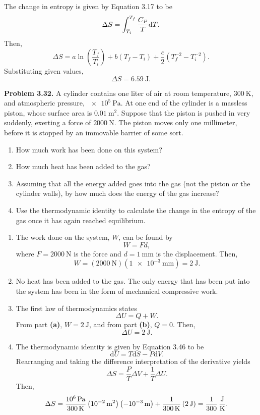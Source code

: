 \documentclass[a4paper, 12pt]{config/homework}
\begin{document}
\noindent
The change in entropy is given by Equation 3.17 to be
\[\Delta S = \int_{T_i}^{T_f}{\frac{C_P}{T} \text{d}T}.\]
Then,
\[\Delta S = a\ln\left(\frac{T_f}{T_i}\right) + b\left(T_f - T_i\right) + \frac{c}{2}\left(T^{-2}_f - T^{-2}_i\right).\]
Substituting given values,
\[\Delta S = \qty{6.59}{\joule}.\]


\pagebreak
\noindent
\textbf{Problem 3.32.} A cylinder contains one liter of air at room temperature, \(\qty{300}{\kelvin}\), and atmospheric pressure, \(\qty{e5}{\Pa}\). At one end of the cylinder is a massless piston, whose surface area is \(\qty{0.01}{\meter\squared}\). Suppose that the piston is pushed in very suddenly, exerting a force of \(\qty{2000}{\newton}\). The piston moves only one millimeter, before it is stopped by an immovable barrier of some sort.
\begin{enumerate}[label=\textbf{(\alph*)}]
\item How much work has been done on this system?
\item How much heat has been added to the gas?
\item Assuming that all the energy added goes into the gas (not the piston or the cylinder walls), by how much does the energy of the gas increase?
\item Use the thermodynamic identity to calculate the change in the entropy of the gas once it has again reached equilibrium.
\end{enumerate}
\bigskip
\begin{enumerate}[label=\textbf{(\alph*)}]
\item The work done on the system, \(W\), can be found by
\[W = Fd,\]
where \(F=\qty{2000}{\newton}\) is the force and \(d=\qty{1}{\milli\meter}\) is the displacement. Then,
\[W = \left(\qty{2000}{\newton}\right)\left(\qty{1e-3}{\milli\meter}\right) = \qty{2}{\joule}.\]
\item No heat has been added to the gas. The only energy that has been put into the system has been in the form of mechanical compressive work.
\item The first law of thermodynamics states
\[\Delta U = Q + W.\]
From part \textbf{(a)}, \(W=\qty{2}{\joule}\), and from part \textbf{(b)}, \(Q=0\). Then,
\[\Delta U = \qty{2}{\joule}.\]
\item The thermodynamic identity is given by Equation 3.46 to be
\[\text{d}U = T\text{d}S - P\text{d}V.\]
Rearranging and taking the difference interpretation of the derivative yields
\[\Delta S = \frac{P}{T}\Delta V + \frac{1}{T}\Delta U.\]
Then,
\[\Delta S = \frac{\qty{e6}{\Pa}}{\qty{300}{\kelvin}}\left(\qty{e-2}{\meter\squared}\right)\left(-\qty{e-3}{\meter}\right) + \frac{1}{\qty{300}{\kelvin}}\left(\qty{2}{\joule}\right)
= \qty[per-mode=fraction, parse-numbers=false]{\frac{1}{300}}{\joule\per\kelvin}.\]
\end{enumerate}
\end{document}
